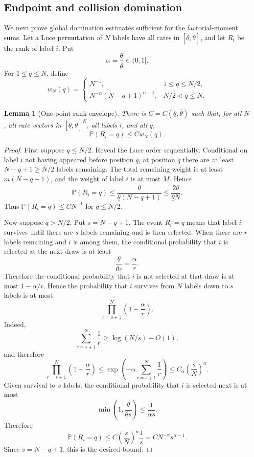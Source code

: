 \documentclass[11pt]{article}
\newtheorem{lemma}[theorem]{Lemma}
\theoremstyle{remark}
\newcommand{\Pp}{\mathbb P}
\begin{document}
\subsection{Endpoint and collision domination}

We next prove global domination estimates sufficient for the factorial-moment sums.  Let a Luce permutation of \(N\) labels have all rates in \([\underline\theta,\overline\theta]\), and let \(R_i\) be the rank of label \(i\).  Put
\[
        \alpha=\frac{\underline\theta}{\overline\theta}\in(0,1].
\]
For \(1\le q\le N\), define
\[
        w_N(q)=
        \begin{cases}
        N^{-1}, & 1\le q\le N/2,\\[4pt]
        N^{-\alpha}(N-q+1)^{\alpha-1}, & N/2<q\le N.
        \end{cases}
\]

\begin{lemma}[One-point rank envelope]\label{lem:one-rank-envelope}
There is \(C=C(\underline\theta,\overline\theta)\) such that, for all \(N\), all rate vectors in \([\underline\theta,\overline\theta]^N\), all labels \(i\), and all \(q\),
\[
        \Pp(R_i=q)\le Cw_N(q).
\]
\end{lemma}

\begin{proof}
First suppose \(q\le N/2\).  Reveal the Luce order sequentially.  Conditional on label \(i\) not having appeared before position \(q\), at position \(q\) there are at least \(N-q+1\ge N/2\) labels remaining.  The total remaining weight is at least \(m(N-q+1)\), and the weight of label \(i\) is at most \(M\).  Hence
\[
        \Pp(R_i=q)
        \le \frac{\overline\theta}{\underline\theta(N-q+1)}
        \le \frac{2\overline\theta}{\underline\theta N}.
\]
Thus \(\Pp(R_i=q)\le C N^{-1}\) for \(q\le N/2\).

Now suppose \(q>N/2\).  Put \(s=N-q+1\).  The event \(R_i=q\) means that label \(i\) survives until there are \(s\) labels remaining and is then selected.  When there are \(r\) labels remaining and \(i\) is among them, the conditional probability that \(i\) is selected at the next draw is at least
\[
        \frac{\underline\theta}{\overline\theta r}=\frac{\alpha}{r}.
\]
Therefore the conditional probability that \(i\) is not selected at that draw is at most \(1-\alpha/r\).  Hence the probability that \(i\) survives from \(N\) labels down to \(s\) labels is at most
\[
        \prod_{r=s+1}^{N}\left(1-\frac{\alpha}{r}\right).
\]
Indeed,
\[
        \sum_{r=s+1}^{N}\frac1r\ge \log(N/s)-O(1),
\]
and therefore
\[
        \prod_{r=s+1}^{N}\left(1-\frac{\alpha}{r}\right)
        \le \exp\left(-\alpha\sum_{r=s+1}^{N}\frac1r\right)
        \le C_\alpha\left(\frac{s}{N}\right)^\alpha.
\]
Given survival to \(s\) labels, the conditional probability that \(i\) is selected next is at most
\[
        \min\left(1,\frac{\overline\theta}{\underline\theta s}\right)\le \frac{1}{\alpha s}.
\]
Therefore
\[
        \Pp(R_i=q)
        \le C\left(\frac{s}{N}\right)^\alpha\frac1s
        =C N^{-\alpha}s^{\alpha-1}.
\]
Since \(s=N-q+1\), this is the desired bound.
\end{proof}
\end{document}
